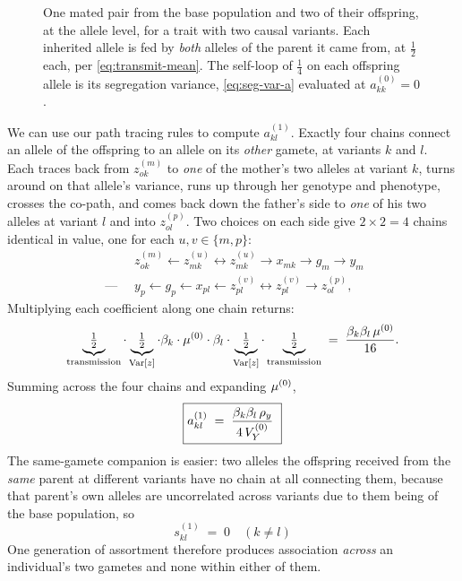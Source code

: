 \documentclass[12pt]{article}
\begin{document}
\begin{figure}
    \begin{floatcard}
        
        \caption{%
            One mated pair from the base population and two of their offspring, at the allele level, for a trait with two causal variants.
            Each inherited allele is fed by \emph{both} alleles of the parent it came from, at $\tfrac12$ each, per \eqref{eq:transmit-mean}.
            The self-loop of $\tfrac14$ on each offspring allele is its segregation variance, \eqref{eq:seg-var-a} evaluated at $a^{(0)}_{kk} = 0$.%
        }
        \label{fig:pair-offspring-2v}
    \end{floatcard}
\end{figure}

We can use our path tracing rules to compute $a^{(1)}_{kl}$.
Exactly four chains connect an allele of the offspring to an allele on its \emph{other} gamete, at variants $k$ and $l$.
Each traces back from $z^{(m)}_{ok}$ to \emph{one} of the mother's two alleles at variant $k$, turns around on that allele's variance, runs up through her genotype and phenotype, crosses the co-path, and comes back down the father's side to \emph{one} of his two alleles at variant $l$ and into $z^{(p)}_{ol}$.
Two choices on each side give $2\times2 = 4$ chains identical in value, one for each $u, v \in \{m,p\}$:
$$
\begin{aligned}
    &z^{(m)}_{ok} \leftarrow z^{(u)}_{mk} \leftrightarrow z^{(u)}_{mk} \rightarrow x_{mk} \rightarrow g_m \rightarrow y_m \\
    \;\text{---}\;\;
    &y_p \leftarrow g_p \leftarrow x_{pl} \leftarrow z^{(v)}_{pl} \leftrightarrow z^{(v)}_{pl} \rightarrow z^{(p)}_{ol} ,
\end{aligned}
$$
Multiplying each coefficient along one chain returns:
$$
    \underbrace{\tfrac12}_{\text{transmission}} \cdot \underbrace{\tfrac12}_{\mathrm{Var}[z]} \cdot \beta_k \cdot \mu^{(0)} \cdot \beta_l \cdot \underbrace{\tfrac12}_{\mathrm{Var}[z]} \cdot \underbrace{\tfrac12}_{\text{transmission}}
    \;=\; \frac{\beta_k\beta_l\,\mu^{(0)}}{16} .
$$
Summing across the four chains and expanding $\mu^{(0)}$,
\begin{equation}\label{eq:a-gen1}
     \boxed{a^{(1)}_{kl} \;=\; \frac{\beta_k\beta_l\,\rho_y}{4\,\VYo} \ }
\end{equation}
The same-gamete companion is easier: two alleles the offspring received from the \emph{same} parent at different variants have no chain at all connecting them, because that parent's own alleles are uncorrelated across variants due to them being of the base population, so
\begin{equation}\label{eq:s-gen1}
    \boxed{\ s^{(1)}_{kl} \;=\; 0 \quad (k \neq l) \ }
\end{equation}
One generation of assortment therefore produces association \emph{across} an individual's two gametes and none within either of them.
\end{document}
